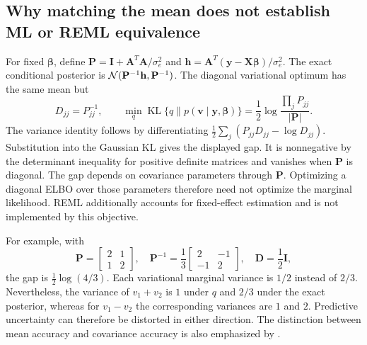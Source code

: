 \subsection{Why matching the mean does not establish ML or REML equivalence}
For fixed $\boldsymbol\beta$, define
$\mathbf P=\mathbf I+\mathbf A^T\mathbf A/\sigma_e^2$ and
$\mathbf h=\mathbf A^T(\mathbf y-\mathbf X\boldsymbol\beta)/\sigma_e^2$.
The exact conditional posterior is
$\mathcal{N}(\mathbf P^{-1}\mathbf h,\mathbf P^{-1})$.
The diagonal variational optimum has the same mean but
\begin{equation}
 D_{jj}=P_{jj}^{-1},\qquad
 \min_q\operatorname{KL}\{q\|p(\mathbf v\mid\mathbf y,\boldsymbol\beta)\}
 =\frac12\log\frac{\prod_j P_{jj}}{|\mathbf P|}.
\end{equation}
The variance identity follows by differentiating
$\tfrac12\sum_j(P_{jj}D_{jj}-\log D_{jj})$.
Substitution into the Gaussian KL gives the displayed gap. It is nonnegative
by the determinant inequality for positive definite matrices and vanishes
when $\mathbf P$ is diagonal. The gap depends on covariance parameters through
$\mathbf P$. Optimizing a diagonal ELBO over those parameters therefore need
not optimize the marginal likelihood. REML additionally accounts for fixed-effect
estimation and is not implemented by this objective.

For example, with
\begin{equation}
 \mathbf P=\begin{bmatrix}2&1\\1&2\end{bmatrix},\quad
 \mathbf P^{-1}=\frac13\begin{bmatrix}2&-1\\-1&2\end{bmatrix},\quad
 \mathbf D=\frac12\mathbf I,
\end{equation}
the gap is $\tfrac12\log(4/3)$. Each variational marginal variance is $1/2$
instead of $2/3$. Nevertheless, the variance of $v_1+v_2$ is $1$ under $q$
and $2/3$ under the exact posterior, whereas for $v_1-v_2$ the corresponding
variances are $1$ and $2$. Predictive uncertainty can therefore be distorted
in either direction. The distinction between mean accuracy and covariance
accuracy is also emphasized by \citet{giordano2018covariances}.

